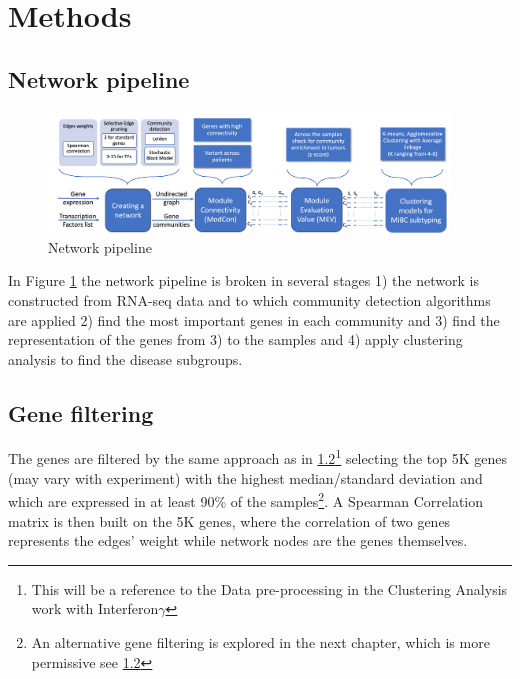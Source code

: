 \section{Methods} \label{s:N_I:methods}

\subsection{Network pipeline}


\begin{figure}[!htb]
    \centering\includegraphics[width=0.95\textwidth,height=0.95\textheight,keepaspectratio]{Sections/Network_I/Resources/Methods/network_pipeline.png}
    \caption{Network pipeline}
    \label{fig:N_I:network_pipeline}
\end{figure}


In Figure \ref{fig:N_I:network_pipeline} the network pipeline is broken in several stages 1) the network is constructed from RNA-seq data and to which community detection algorithms are applied 2) find the most important genes in each community and 3) find the representation of the genes from 3) to the samples and 4) apply clustering analysis to find the disease subgroups.


\subsection{Gene filtering}
The genes are filtered by the same approach as in \ref{}\footnote{This will be a reference to the Data pre-processing in the Clustering Analysis work with Interferon$\gamma$} selecting the top 5K genes (may vary with experiment) with the highest median/standard deviation and which are expressed in at least 90\% of the samples\footnote{An alternative gene filtering is explored in the next chapter, which is more permissive see \ref{}}. A Spearman Correlation matrix is then built on the 5K genes, where the correlation of two genes represents the edges' weight while network nodes are the genes themselves. 

